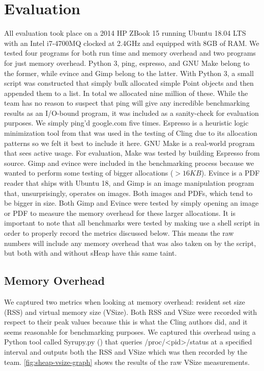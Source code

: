 \documentclass[conference]{IEEEtran}
\begin{document}
\section{Evaluation}
All evaluation took place on a 2014 HP ZBook 15 running Ubuntu 18.04 LTS with an Intel 
i7-4700MQ clocked at 2.4GHz and equipped with 8GB of RAM. We tested four programs for 
both run time and memory overhead and two programs for just memory overhead. Python 3, 
ping, espresso, and GNU Make belong to the former, while evince and Gimp belong to the 
latter. With Python 3, a small script was constructed that simply bulk allocated simple 
Point objects and then appended them to a list. In total we allocated nine million of 
these. While the team has no reason to suspect that ping will give any incredible 
benchmarking results as an I/O-bound program, it was included as a sanity-check for 
evaluation purposes. We simply ping’d google.com five times. Espresso is a heuristic 
logic minimization tool from \cite{b4} that was used in the testing of Cling due to 
its allocation patterns so we felt it best to include it here. GNU Make is a 
real-world program that sees active usage. For evaluation, Make was tested by building 
Espresso from source. Gimp and evince were included in the benchmarking process because 
we wanted to perform some testing of bigger allocations ($>16KB$). Evince is a PDF reader 
that ships with Ubuntu 18, and Gimp is an image manipulation program that, 
unsurprisingly, operates on images. Both images and PDFs, which tend to be bigger in 
size. Both Gimp and Evince were tested by simply opening an image or PDF to measure the 
memory overhead for these larger allocations. It is important to note that all 
benchmarks were tested by making use a shell script in order to properly record the 
metrics discussed below. This means the raw numbers will include any memory overhead that 
was also taken on by the script, but both with and without sHeap have this same taint.

\subsection{Memory Overhead}
We captured two metrics when looking at memory overhead: resident set size (RSS) and 
virtual memory size (VSize). Both RSS and VSize were recorded with respect to their peak 
values because this is what the Cling authors did, and it seems reasonable for 
benchmarking purposes. We captured this overhead using a Python tool called Syrupy.py 
(\cite{b5}) that queries /proc/<pid>/status at a specified interval and outputs both the 
RSS and VSize which was then recorded by the team. \ref{fig:sheap-vsize-graph} shows the 
results of the raw VSize measurements. 
\end{document}
